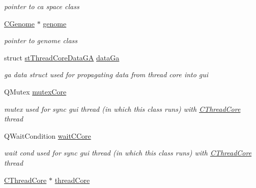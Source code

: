 \begin{DoxyCompactItemize}
\begin{DoxyCompactList}\small\item\em pointer to ca space class \item\end{DoxyCompactList}\item 
\hypertarget{classCCore_a20b827bf2dafe610e9a5228eb9c6e7ae}{
\hyperlink{classCGenome}{CGenome} $\ast$ \hyperlink{classCCore_a20b827bf2dafe610e9a5228eb9c6e7ae}{genome}}
\label{classCCore_a20b827bf2dafe610e9a5228eb9c6e7ae}

\begin{DoxyCompactList}\small\item\em pointer to genome class \item\end{DoxyCompactList}\item 
\hypertarget{classCCore_a2699b566011cda9d1f69f36c734811ea}{
struct \hyperlink{structstThreadCoreDataGA}{stThreadCoreDataGA} \hyperlink{classCCore_a2699b566011cda9d1f69f36c734811ea}{dataGa}}
\label{classCCore_a2699b566011cda9d1f69f36c734811ea}

\begin{DoxyCompactList}\small\item\em ga data struct used for propagating data from thread core into gui \item\end{DoxyCompactList}\item 
\hypertarget{classCCore_a36b1cf10df7c1d3bd036d69a109ae81b}{
QMutex \hyperlink{classCCore_a36b1cf10df7c1d3bd036d69a109ae81b}{mutexCore}}
\label{classCCore_a36b1cf10df7c1d3bd036d69a109ae81b}

\begin{DoxyCompactList}\small\item\em mutex used for sync gui thread (in which this class runs) with \hyperlink{classCThreadCore}{CThreadCore} thread \item\end{DoxyCompactList}\item 
\hypertarget{classCCore_abf4a4a3ebe49dc69c3c27dd545aa4606}{
QWaitCondition \hyperlink{classCCore_abf4a4a3ebe49dc69c3c27dd545aa4606}{waitCCore}}
\label{classCCore_abf4a4a3ebe49dc69c3c27dd545aa4606}

\begin{DoxyCompactList}\small\item\em wait cond used for sync gui thread (in which this class runs) with \hyperlink{classCThreadCore}{CThreadCore} thread \item\end{DoxyCompactList}\item 
\hypertarget{classCCore_a06fcd7735c831f7dcf1e855313dab8a5}{
\hyperlink{classCThreadCore}{CThreadCore} $\ast$ \hyperlink{classCCore_a06fcd7735c831f7dcf1e855313dab8a5}{threadCore}}
\label{classCCore_a06fcd7735c831f7dcf1e855313dab8a5}


\end{DoxyCompactItemize}
